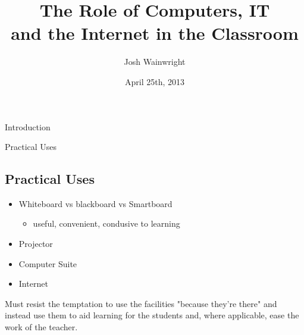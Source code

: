 \documentclass{beamer}
\title[Role of IT in the Classroom]{The Role of Computers, IT\\and the Internet in the Classroom}
\author{Josh Wainwright}
\institute{King Edward VI Five Ways School\\ Bartley Green}
\date{April 25th, 2013}
\begin{document}
\begin{frame}
\titlepage
\end{frame}


\begin{frame}{Introduction}
    \tableofcontents[currentsection]
\end{frame}

\begin{frame}{Practical Uses}
    \subsection{Practical Uses} 
    \begin{itemize}
        \item Whiteboard vs blackboard vs Smartboard
        \begin{itemize}
            \item useful, convenient, condusive to learning
        \end{itemize}
        \item Projector
        \item Computer Suite
        \item Internet
    \end{itemize}
    Must resist the temptation to use the facilities "because they're there" and instead use them to aid learning for the students and, where applicable, ease the work of the teacher.
\end{frame}
\end{document}
